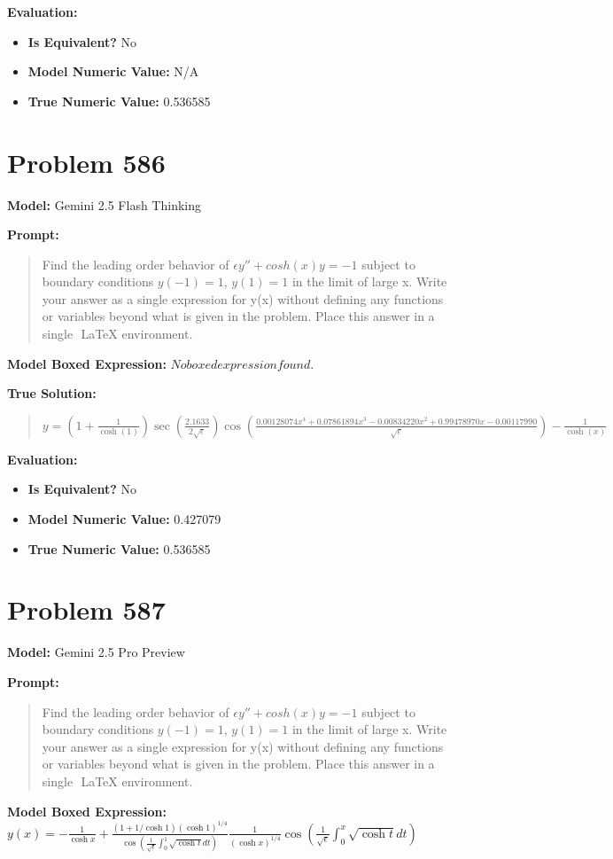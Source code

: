 \documentclass{article}
\begin{document}
\textbf{Evaluation:}
\begin{itemize}
\item \textbf{Is Equivalent?} No
\item \textbf{Model Numeric Value:} N/A
\item \textbf{True Numeric Value:} 0.536585
\end{itemize}
\vspace{1cm}
\section*{Problem 586}
\textbf{Model:} Gemini 2.5 Flash Thinking

\textbf{Prompt:}
\begin{quote}
Find the leading order behavior of $\epsilon y'' + cosh(x)y = -1$ subject to boundary conditions $y(-1) = 1$, $y(1) = 1$ in the limit of large x. Write your answer as a single expression for y(x) without defining any functions or variables beyond what is given in the problem. Place this answer in a single $\boxed{}$ LaTeX environment.
\end{quote}
\textbf{Model Boxed Expression:} $No boxed expression found.$

\textbf{True Solution:}
\begin{quote}
$y = (1+\frac{1}{\cosh(1)}) \sec(\frac{2.1633}{2\sqrt{\epsilon}})\cos(\frac{0.00128074x^4 + 0.07861894x^3 - 0.00834220x^2 + 0.99478970x - 0.00117990}{\sqrt{\epsilon}})- \frac{1}{\cosh(x)}$
\end{quote}

\textbf{Evaluation:}
\begin{itemize}
\item \textbf{Is Equivalent?} No
\item \textbf{Model Numeric Value:} 0.427079
\item \textbf{True Numeric Value:} 0.536585
\end{itemize}
\vspace{1cm}
\section*{Problem 587}
\textbf{Model:} Gemini 2.5 Pro Preview

\textbf{Prompt:}
\begin{quote}
Find the leading order behavior of $\epsilon y'' + cosh(x)y = -1$ subject to boundary conditions $y(-1) = 1$, $y(1) = 1$ in the limit of large x. Write your answer as a single expression for y(x) without defining any functions or variables beyond what is given in the problem. Place this answer in a single $\boxed{}$ LaTeX environment.
\end{quote}
\textbf{Model Boxed Expression:} $y(x) = -\frac{1}{\cosh x} + \frac{(1+1/\cosh 1)(\cosh 1)^{1/4}}{\cos\left(\frac{1}{\sqrt{\epsilon}}\int_0^1 \sqrt{\cosh t}dt\right)} \frac{1}{(\cosh x)^{1/4}} \cos\left(\frac{1}{\sqrt{\epsilon}}\int_0^x \sqrt{\cosh t}dt\right)$
\end{document}
